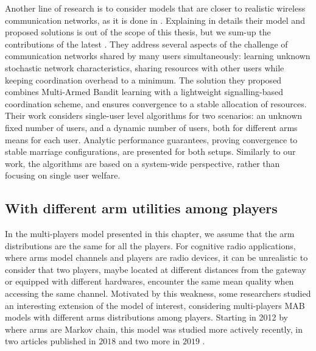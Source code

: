 Another line of research is to consider models that are closer to realistic wireless communication networks, as it is done in \cite{Avner16,AvnerMannor18}.
Explaining in details their model and proposed solutions is out of the scope of this thesis,
but we sum-up the contributions of the latest \cite{AvnerMannor18}.
%
They address several aspects of the challenge of communication networks shared by many users simultaneously: learning unknown stochastic network characteristics, sharing resources with other users while keeping coordination overhead to a minimum.
The solution they proposed combines Multi-Armed Bandit learning with a lightweight signalling-based coordination scheme, and ensures convergence to a stable allocation of resources.
Their work considers single-user level algorithms for two scenarios: an unknown fixed number of users, and a dynamic number of users, both for different arms means for each user.
Analytic performance guarantees, proving convergence to stable marriage configurations, are presented for both setups.
Similarly to our work, the algorithms are based on a system-wide perspective, rather than focusing on single user welfare.
%



\subsection{With different arm utilities among players}
\label{sub:5:withDifferentMeansAmongPlayers}

In the multi-players model presented in this chapter, we assume that the arm distributions are the same for all the players.
For cognitive radio applications, where arms model channels and players are radio devices, it can be unrealistic to consider that two players, maybe located at different distances from the gateway or equipped with different hardwares, encounter the same mean quality when accessing the same channel.
%
Motivated by this weakness, some researchers studied an interesting extension of the model of interest, considering multi-players MAB models with different arms distributions among players.
%
Starting in 2012 by \cite{Kalathil12} where arms are Markov chain, this model was studied more actively recently, in two articles published in $2018$ \cite{DarakHanawal18,Bistritz18} and two more in $2019$ \cite{KaufmannAbbas19,Tibrewal2019}.

